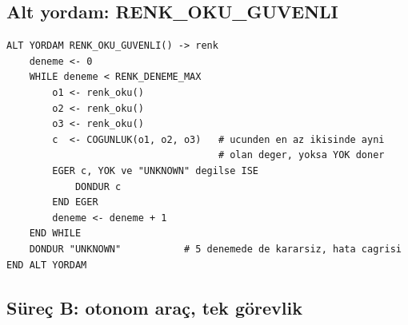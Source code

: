 \documentclass[11pt,a4paper]{article}
\begin{document}
\subsection*{Alt yordam: RENK\_OKU\_GUVENLI}

\begin{verbatim}
ALT YORDAM RENK_OKU_GUVENLI() -> renk
    deneme <- 0
    WHILE deneme < RENK_DENEME_MAX
        o1 <- renk_oku()
        o2 <- renk_oku()
        o3 <- renk_oku()
        c  <- COGUNLUK(o1, o2, o3)   # ucunden en az ikisinde ayni
                                     # olan deger, yoksa YOK doner
        EGER c, YOK ve "UNKNOWN" degilse ISE
            DONDUR c
        END EGER
        deneme <- deneme + 1
    END WHILE
    DONDUR "UNKNOWN"           # 5 denemede de kararsiz, hata cagrisi
END ALT YORDAM
\end{verbatim}

\clearpage

\subsection*{Süreç B: otonom araç, tek görevlik}
\end{document}
